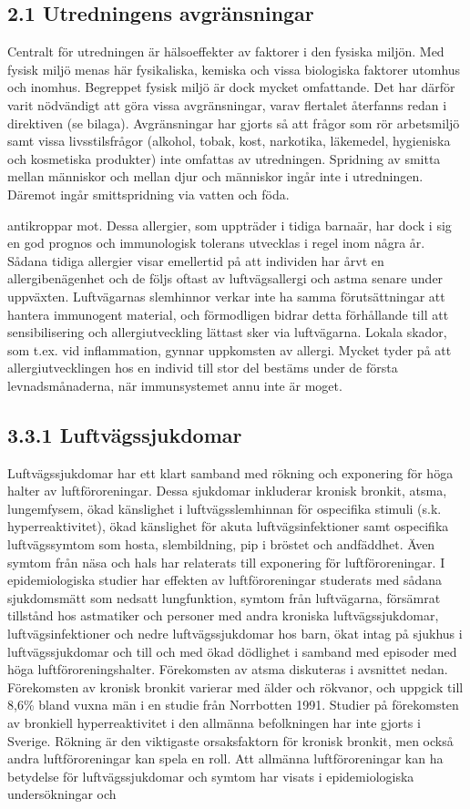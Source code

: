 \subsection*{2.1 Utredningens avgränsningar}
Centralt för utredningen är hälsoeffekter av faktorer i den fysiska miljön. Med fysisk miljö menas här fysikaliska, kemiska och vissa biologiska faktorer utomhus och inomhus. Begreppet fysisk miljö är dock mycket omfattande. Det har därför varit nödvändigt att göra vissa avgränsningar, varav flertalet återfanns redan i direktiven (se bilaga).
Avgränsningar har gjorts så att frågor som rör arbetsmiljö samt vissa livsstilsfrågor (alkohol, tobak, kost, narkotika, läkemedel, hygieniska och kosmetiska produkter) inte omfattas av utredningen. Spridning av smitta mellan människor och mellan djur och människor ingår inte i utredningen. Däremot ingår smittspridning via vatten och föda.

antikroppar mot. Dessa allergier, som uppträder i tidiga barnaär, har dock i sig en god prognos och immunologisk tolerans utvecklas i regel inom några år. Sådana tidiga allergier visar emellertid på att individen har årvt en allergibenägenhet och de följs oftast av luftvägsallergi och astma senare under uppväxten. Luftvägarnas slemhinnor verkar inte ha samma förutsättningar att hantera immunogent material, och förmodligen bidrar detta förhållande till att sensibilisering och allergiutveckling lättast sker via luftvägarna. Lokala skador, som t.ex. vid inflammation, gynnar uppkomsten av allergi.
Mycket tyder på att allergiutvecklingen hos en individ till stor del bestäms under de första levnadsmånaderna, när immunsystemet annu inte är moget.
\subsection*{3.3.1 Luftvägssjukdomar}
Luftvägssjukdomar har ett klart samband med rökning och exponering för höga halter av luftföroreningar. Dessa sjukdomar inkluderar kronisk bronkit, atsma, lungemfysem, ökad känslighet i luftvägsslemhinnan för ospecifika stimuli (s.k. hyperreaktivitet), ökad känslighet för akuta luftvägsinfektioner samt ospecifika luftvägssymtom som hosta, slembildning, pip i bröstet och andfäddhet. Även symtom från näsa och hals har relaterats till exponering för luftföroreningar. I epidemiologiska studier har effekten av luftföroreningar studerats med sådana sjukdomsmätt som nedsatt lungfunktion, symtom från luftvägarna, försämrat tillstånd hos astmatiker och personer med andra kroniska luftvägssjukdomar, luftvägsinfektioner och nedre luftvägssjukdomar hos barn, ökat intag på sjukhus i luftvägssjukdomar och till och med ökad dödlighet i samband med episoder med höga luftföroreningshalter.
Förekomsten av atsma diskuteras i avsnittet nedan. Förekomsten av kronisk bronkit varierar med älder och rökvanor, och uppgick till 8,6\% bland vuxna män i en studie från Norrbotten 1991. Studier på förekomsten av bronkiell hyperreaktivitet i den allmänna befolkningen har inte gjorts i Sverige.
Rökning är den viktigaste orsaksfaktorn för kronisk bronkit, men också andra luftföroreningar kan spela en roll. Att allmänna luftföroreningar kan ha betydelse för luftvägssjukdomar och symtom har visats i epidemiologiska undersökningar och

